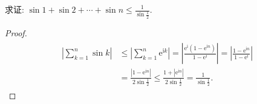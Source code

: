 \begin{exercise}
	求证: $\sin 1+\sin 2+\cdots+\sin n \leqslant \frac{1}{\sin \frac{1}{2}}$.
\end{exercise}
\begin{proof}
	\begin{align*}
		\begin{aligned}
			\left|\sum_{k=1}^n \sin k\right| & \leqslant\left|\sum_{k=1}^n \mathrm{e}^{\mathrm{i} k}\right|=\left|\frac{\mathrm{e}^{\mathrm{i}}\left(1-\mathrm{e}^{\mathrm{i} n}\right)}{1-\mathrm{e}^{\mathrm{i}}}\right|=\left|\frac{1-\mathrm{e}^{\mathrm{i} n}}{1-\mathrm{e}^{\mathrm{i}}}\right| \\
			                                 & =\frac{\left|1-\mathrm{e}^{\mathrm{i} n}\right|}{2 \sin \frac{1}{2}} \leqslant \frac{1+\left|\mathrm{e}^{\mathrm{i} n}\right|}{2 \sin \frac{1}{2}}=\frac{1}{\sin \frac{1}{2}} .
		\end{aligned}
	\end{align*}
\end{proof}

